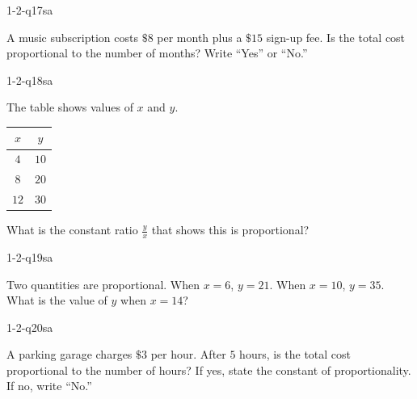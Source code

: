 \begin{practiceQuestion}{1-2-q17}{sa}
\begin{questionText}
A music subscription costs $\$8$ per month plus a $\$15$ sign-up fee. Is the total cost proportional to the number of months? Write ``Yes'' or ``No.''
\end{questionText}
\end{practiceQuestion}

\begin{practiceQuestion}{1-2-q18}{sa}
\begin{questionText}
The table shows values of $x$ and $y$.

\begin{center}
\begin{tabular}{|c|c|}
\hline
$x$ & $y$ \\
\hline
$4$ & $10$ \\
$8$ & $20$ \\
$12$ & $30$ \\
\hline
\end{tabular}
\end{center}

What is the constant ratio $\frac{y}{x}$ that shows this is proportional?
\end{questionText}
\end{practiceQuestion}

\begin{practiceQuestion}{1-2-q19}{sa}
\begin{questionText}
Two quantities are proportional. When $x = 6$, $y = 21$. When $x = 10$, $y = 35$. What is the value of $y$ when $x = 14$?
\end{questionText}
\end{practiceQuestion}

\begin{practiceQuestion}{1-2-q20}{sa}
\begin{questionText}
A parking garage charges $\$3$ per hour. After $5$ hours, is the total cost proportional to the number of hours? If yes, state the constant of proportionality. If no, write ``No.''
\end{questionText}
\end{practiceQuestion}

